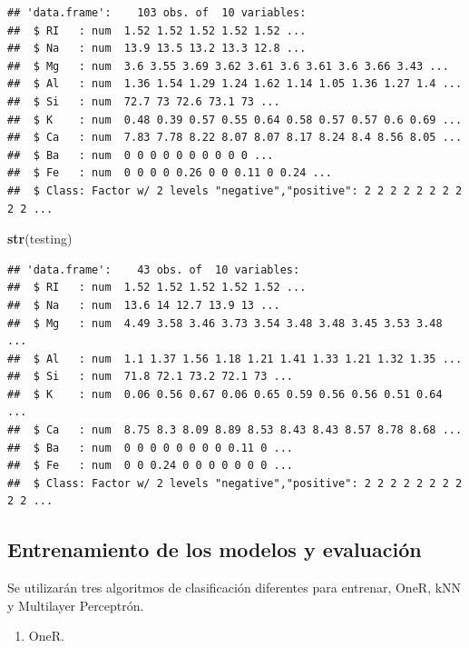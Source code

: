 \documentclass[]{article}
\newenvironment{Shaded}{\begin{snugshade}}{\end{snugshade}}
\newcommand{\KeywordTok}[1]{\textcolor[rgb]{0.13,0.29,0.53}{\textbf{#1}}}
\newcommand{\NormalTok}[1]{#1}
\providecommand{\tightlist}{%
  \setlength{\itemsep}{0pt}\setlength{\parskip}{0pt}}
\begin{document}
\begin{verbatim}
## 'data.frame':    103 obs. of  10 variables:
##  $ RI   : num  1.52 1.52 1.52 1.52 1.52 ...
##  $ Na   : num  13.9 13.5 13.2 13.3 12.8 ...
##  $ Mg   : num  3.6 3.55 3.69 3.62 3.61 3.6 3.61 3.6 3.66 3.43 ...
##  $ Al   : num  1.36 1.54 1.29 1.24 1.62 1.14 1.05 1.36 1.27 1.4 ...
##  $ Si   : num  72.7 73 72.6 73.1 73 ...
##  $ K    : num  0.48 0.39 0.57 0.55 0.64 0.58 0.57 0.57 0.6 0.69 ...
##  $ Ca   : num  7.83 7.78 8.22 8.07 8.07 8.17 8.24 8.4 8.56 8.05 ...
##  $ Ba   : num  0 0 0 0 0 0 0 0 0 0 ...
##  $ Fe   : num  0 0 0 0 0.26 0 0 0.11 0 0.24 ...
##  $ Class: Factor w/ 2 levels "negative","positive": 2 2 2 2 2 2 2 2 2 2 ...
\end{verbatim}

\begin{Shaded}
\begin{Highlighting}[]
\KeywordTok{str}\NormalTok{(testing)}
\end{Highlighting}
\end{Shaded}

\begin{verbatim}
## 'data.frame':    43 obs. of  10 variables:
##  $ RI   : num  1.52 1.52 1.52 1.52 1.52 ...
##  $ Na   : num  13.6 14 12.7 13.9 13 ...
##  $ Mg   : num  4.49 3.58 3.46 3.73 3.54 3.48 3.48 3.45 3.53 3.48 ...
##  $ Al   : num  1.1 1.37 1.56 1.18 1.21 1.41 1.33 1.21 1.32 1.35 ...
##  $ Si   : num  71.8 72.1 73.2 72.1 73 ...
##  $ K    : num  0.06 0.56 0.67 0.06 0.65 0.59 0.56 0.56 0.51 0.64 ...
##  $ Ca   : num  8.75 8.3 8.09 8.89 8.53 8.43 8.43 8.57 8.78 8.68 ...
##  $ Ba   : num  0 0 0 0 0 0 0 0 0.11 0 ...
##  $ Fe   : num  0 0 0.24 0 0 0 0 0 0 0 ...
##  $ Class: Factor w/ 2 levels "negative","positive": 2 2 2 2 2 2 2 2 2 2 ...
\end{verbatim}

\hypertarget{entrenamiento-de-los-modelos-y-evaluaciuxf3n}{%
\subsection{Entrenamiento de los modelos y
evaluación}\label{entrenamiento-de-los-modelos-y-evaluaciuxf3n}}

Se utilizarán tres algoritmos de clasificación diferentes para entrenar,
OneR, kNN y Multilayer Perceptrón.

\begin{enumerate}
\def\labelenumi{\arabic{enumi}.}
\tightlist
\item
  OneR.
\end{enumerate}
\end{document}

